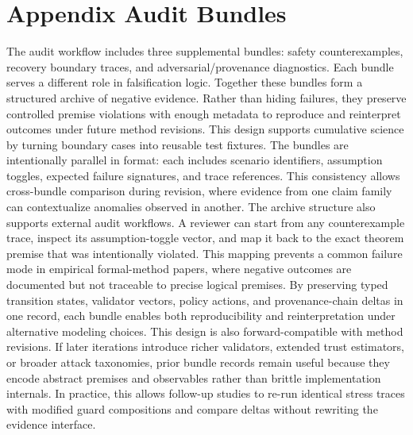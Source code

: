 \documentclass{article} %
\begin{document}
\section{Appendix Audit Bundles}
\label{app:bundles}
The audit workflow includes three supplemental bundles: safety counterexamples, recovery boundary traces, and adversarial/provenance diagnostics. Each bundle serves a different role in falsification logic.
Together these bundles form a structured archive of negative evidence. Rather than hiding failures, they preserve controlled premise violations with enough metadata to reproduce and reinterpret outcomes under future method revisions. This design supports cumulative science by turning boundary cases into reusable test fixtures.
The bundles are intentionally parallel in format: each includes scenario identifiers, assumption toggles, expected failure signatures, and trace references. This consistency allows cross-bundle comparison during revision, where evidence from one claim family can contextualize anomalies observed in another.
The archive structure also supports external audit workflows. A reviewer can start from any counterexample trace, inspect its assumption-toggle vector, and map it back to the exact theorem premise that was intentionally violated. This mapping prevents a common failure mode in empirical formal-method papers, where negative outcomes are documented but not traceable to precise logical premises. By preserving typed transition states, validator vectors, policy actions, and provenance-chain deltas in one record, each bundle enables both reproducibility and reinterpretation under alternative modeling choices.
This design is also forward-compatible with method revisions. If later iterations introduce richer validators, extended trust estimators, or broader attack taxonomies, prior bundle records remain useful because they encode abstract premises and observables rather than brittle implementation internals. In practice, this allows follow-up studies to re-run identical stress traces with modified guard compositions and compare deltas without rewriting the evidence interface.
\end{document}

